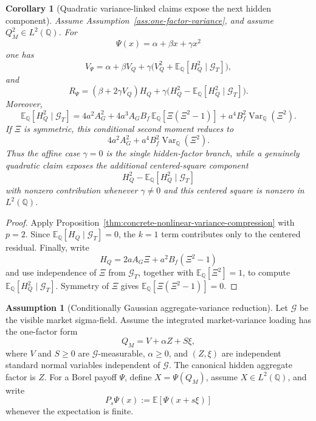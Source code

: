 \documentclass[11pt,a4paper]{amsart}
\theoremstyle{plain}
\newtheorem{corollary}[theorem]{Corollary}
\theoremstyle{definition}
\newtheorem{assumption}[theorem]{Assumption}
\theoremstyle{remark}
\DeclareMathOperator{\Var}{Var}
\newcommand{\QQ}{\mathbb{Q}}
\newcommand{\EE}{\mathbb{E}}
\newcommand{\cG}{\mathcal{G}}
\begin{document}
\begin{corollary}[Quadratic variance-linked claims expose the next hidden component]\label{cor:quadratic-variance-hidden-hierarchy}
Assume Assumption~\ref{ass:one-factor-variance}, and assume \(Q_M^2\in L^2(\QQ)\).  For
\[
        \Psi(x)=\alpha+\beta x+\gamma x^2
\]
one has
\[
        V_\Psi
        =
        \alpha+\beta V_Q+\gamma
        \bigl(V_Q^2+\EE_\QQ[H_Q^2\mid\cG_T]\bigr),
\]
and
\[
        R_\Psi
        =
        (\beta+2\gamma V_Q)H_Q+
        \gamma\bigl(H_Q^2-\EE_\QQ[H_Q^2\mid\cG_T]\bigr).
\]
Moreover,
\[
        \EE_\QQ[H_Q^2\mid\cG_T]
        =
        4a^2A_G^2+
        4a^3A_GB_f\,\EE_\QQ[\Xi(\Xi^2-1)]
        +
        a^4B_f^2\Var_\QQ(\Xi^2).
\]
If \(\Xi\) is symmetric, this conditional second moment reduces to
\[
        4a^2A_G^2+a^4B_f^2\Var_\QQ(\Xi^2).
\]
Thus the affine case \(\gamma=0\) is the single hidden-factor branch, while a genuinely quadratic
claim exposes the additional centered-square component
\[
        H_Q^2-\EE_\QQ[H_Q^2\mid\cG_T]
\]
with nonzero contribution whenever \(\gamma\neq0\) and this centered square is nonzero in
\(L^2(\QQ)\).
\end{corollary}

\begin{proof}
Apply Proposition~\ref{thm:concrete-nonlinear-variance-compression} with \(p=2\).  Since
\(\EE_\QQ[H_Q\mid\cG_T]=0\), the \(k=1\) term contributes only to the centered residual.  Finally,
write
\[
        H_Q=2aA_G\Xi+a^2B_f(\Xi^2-1)
\]
and use independence of \(\Xi\) from \(\cG_T\), together with
\(\EE_\QQ[\Xi^2]=1\), to compute \(\EE_\QQ[H_Q^2\mid\cG_T]\).  Symmetry of \(\Xi\) gives
\(\EE_\QQ[\Xi(\Xi^2-1)]=0\).
\end{proof}

\begin{assumption}[Conditionally Gaussian aggregate-variance reduction]\label{ass:cg-onefactor}
Let \(\cG\) be the visible market sigma-field.  Assume the integrated market-variance loading has
the one-factor form
\[
        Q_M=V+\alpha Z+S\xi,
\]
where \(V\) and \(S\ge0\) are \(\cG\)-measurable, \(\alpha\ge0\), and \((Z,\xi)\) are independent
standard normal variables independent of \(\cG\).  The canonical hidden aggregate factor is \(Z\).
For a Borel payoff \(\Psi\), define \(X=\Psi(Q_M)\), assume \(X\in L^2(\QQ)\), and write
\[
        P_s\Psi(x):=\EE[\Psi(x+s\xi)]
\]
whenever the expectation is finite.
\end{assumption}
\end{document}
